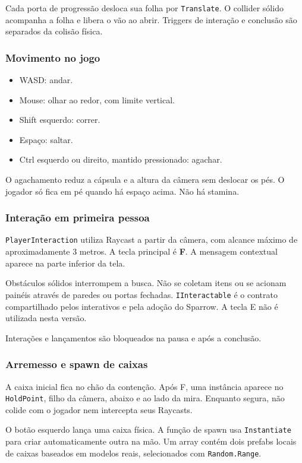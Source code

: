 \documentclass[12pt,a4paper]{article}
\begin{document}
Cada porta de progressão desloca sua folha por \texttt{Translate}.
O collider sólido acompanha a folha e libera o vão ao abrir.
Triggers de interação e conclusão são separados da colisão física.

\subsubsection{Movimento no jogo}

\begin{itemize}
\item WASD: andar.
\item Mouse: olhar ao redor, com limite vertical.
\item Shift esquerdo: correr.
\item Espaço: saltar.
\item Ctrl esquerdo ou direito, mantido pressionado: agachar.
\end{itemize}

O agachamento reduz a cápsula e a altura da câmera sem deslocar os
pés. O jogador só fica em pé quando há espaço acima. Não há stamina.

\subsubsection{Interação em primeira pessoa}

\texttt{PlayerInteraction} utiliza Raycast a partir da câmera, com
alcance máximo de aproximadamente 3 metros. A tecla principal é
\textbf{F}. A mensagem contextual aparece na parte inferior da tela.

Obstáculos sólidos interrompem a busca. Não se coletam itens ou se
acionam painéis através de paredes ou portas fechadas.
\texttt{IInteractable} é o contrato compartilhado pelos interativos
e pela adoção do Sparrow. A tecla E não é utilizada nesta versão.

Interações e lançamentos são bloqueados na pausa e após a conclusão.

\subsubsection{Arremesso e spawn de caixas}

A caixa inicial fica no chão da contenção. Após F, uma instância
aparece no \texttt{HoldPoint}, filho da câmera, abaixo e ao lado da
mira. Enquanto segura, não colide com o jogador nem intercepta seus
Raycasts.

O botão esquerdo lança uma caixa física. A função de spawn usa
\texttt{Instantiate} para criar automaticamente outra na mão.
Um array contém dois prefabs locais de caixas baseados em modelos
reais, selecionados com \texttt{Random.Range}.
\end{document}
